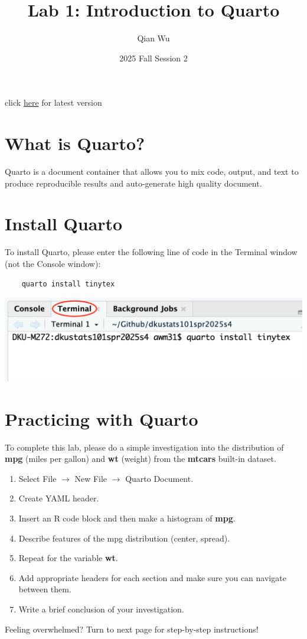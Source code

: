 \documentclass[12pt]{article}
\begin{document}
\title{Lab 1: Introduction to Quarto}
\author{Qian Wu}
\date{2025 Fall Session 2}

\maketitle
\begin{center}
   click \href{https://qianwu-dku.github.io/STAT101/Lab1/lab1_instruction.pdf}{here} for latest version   
\end{center}
\section{What is Quarto?}
Quarto is a document container that allows you to mix code, output, and text to produce reproducible results and auto-generate high quality document. 

\section{Install Quarto}
To install Quarto, please enter the following line of code in the Terminal window (not the Console window):    
\begin{verbatim}
    quarto install tinytex
\end{verbatim}
\begin{center}
    \includegraphics[scale=0.3]{Terminal.png}
\end{center}


\section{Practicing with Quarto}
To complete this lab, please do a simple investigation into the distribution of \textbf{mpg} (miles per gallon) and \textbf{wt} (weight) from the \textbf{mtcars} built-in dataset.
\begin{enumerate}
    \item Select File $\rightarrow$ New File $\rightarrow$ Quarto Document. 
    \item Create YAML header.
    \item Insert an R code block and then make a histogram of \textbf{mpg}.
    \item Describe features of the mpg distribution (center, spread).
    \item Repeat for the variable \textbf{wt}.
    \item Add appropriate headers for each section and make sure you can navigate between them.
    \item Write a brief conclusion of your investigation.
\end{enumerate}
Feeling overwhelmed? Turn to next page for step-by-step instructions!
\end{document}
